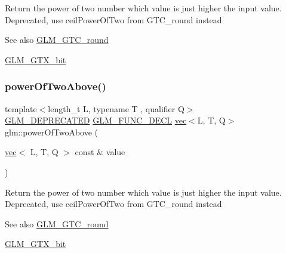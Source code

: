 Return the power of two number which value is just higher the input value. Deprecated, use ceil\+Power\+Of\+Two from G\+T\+C\+\_\+round instead

\begin{DoxySeeAlso}{See also}
\mbox{\hyperlink{group__gtc__round}{G\+L\+M\+\_\+\+G\+T\+C\+\_\+round}} 

\mbox{\hyperlink{group__gtx__bit}{G\+L\+M\+\_\+\+G\+T\+X\+\_\+bit}} 
\end{DoxySeeAlso}
\mbox{\label{group__gtx__bit_ga2bbded187c5febfefc1e524ba31b3fab}} 
\subsubsection{\texorpdfstring{power\+Of\+Two\+Above()}{powerOfTwoAbove()}\hspace{0.1cm}{\footnotesize\ttfamily [2/2]}}
{\footnotesize\ttfamily template$<$length\+\_\+t L, typename T , qualifier Q$>$ \\
\mbox{\hyperlink{setup_8hpp_a8edfb48cdc249a3ee48406bf179023dc}{G\+L\+M\+\_\+\+D\+E\+P\+R\+E\+C\+A\+T\+ED}} \mbox{\hyperlink{setup_8hpp_ab2d052de21a70539923e9bcbf6e83a51}{G\+L\+M\+\_\+\+F\+U\+N\+C\+\_\+\+D\+E\+CL}} \mbox{\hyperlink{structglm_1_1vec}{vec}}$<$L, T, Q$>$ glm\+::power\+Of\+Two\+Above (\begin{DoxyParamCaption}\item[{\mbox{\hyperlink{structglm_1_1vec}{vec}}$<$ L, T, Q $>$ const \&}]{value }\end{DoxyParamCaption})}

Return the power of two number which value is just higher the input value. Deprecated, use ceil\+Power\+Of\+Two from G\+T\+C\+\_\+round instead

\begin{DoxySeeAlso}{See also}
\mbox{\hyperlink{group__gtc__round}{G\+L\+M\+\_\+\+G\+T\+C\+\_\+round}} 

\mbox{\hyperlink{group__gtx__bit}{G\+L\+M\+\_\+\+G\+T\+X\+\_\+bit}} 
\end{DoxySeeAlso}
\mbox{\label{group__gtx__bit_ga3de7df63c589325101a2817a56f8e29d}} 
